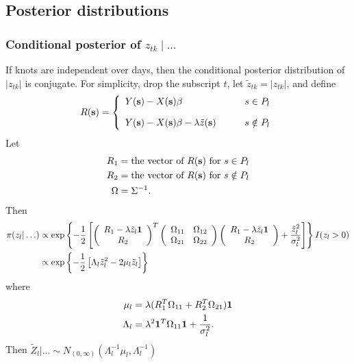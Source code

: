 \documentclass[11pt]{article}
\begin{document}
\subsection{Posterior distributions} \label{a:posterior}

\subsubsection*{Conditional posterior of $z_{tk} \mid \ldots $}\label{s:mvcondu}
If knots are independent over days, then the conditional posterior distribution of $|z_{tk}|$ is conjugate.
For simplicity, drop the subscript $t$, let $\tilde{z}_{tk} = |z_{tk}|$, and define
\begin{align*}
R(\mbox{\bf s}) = \left\{
    \begin{array}{ll}
        Y(\mbox{\bf s}) - X(\mbox{\bf s}) \beta &s \in P_l\\[1em]
        Y(\mbox{\bf s}) - X(\mbox{\bf s}) \beta - \lambda \tilde{z}(\mbox{\bf s}) \qquad & s \notin P_l
    \end{array}
\right.
\end{align*}
Let
\begin{align*}
    R_1 &= \text{the vector of } R(\mbox{\bf s}) \text{ for } s \in P_l \\
    R_2 &= \text{the vector of } R(\mbox{\bf s}) \text{ for } s \notin P_l \\
    \Omega &= \Sigma^{-1}.
\end{align*}
Then
\begin{align*}
    \pi(z_l | \ldots) &\propto \exp \left\{ -\frac{ 1 }{ 2 } \left[
        \left( \begin{array}{c}
            R_1 - \lambda \tilde{z}_l \mbox{\boldmath $1$}\\
            R_2
        \end{array} \right)^T
        \left( \begin{array}{cc}
            \Omega_{11} & \Omega_{12}\\
            \Omega_{21} & \Omega_{22}
        \end{array} \right)
        \left( \begin{array}{c}
            R_1 - \lambda \tilde{z}_l \mbox{\boldmath $1$}\\
            R_2
        \end{array} \right)
        +  \frac{ {\tilde{z}_l}^2 }{ \sigma_l^2 }\right]
    \right\} I(z_l > 0) \\
        &\propto \exp \left\{ -\frac{ 1 }{ 2 } \left[ \Lambda_l {\tilde{z}_l}^2 - 2 \mu_l \tilde{z}_l \right] \right\}
\end{align*}
where
\begin{align*}
    \mu_l &= \lambda ( R_1^T \Omega_{11} + R_2^T \Omega_{21} )\mbox{\boldmath $1$}\\
    \Lambda_l &= \lambda^2 \mbox{\boldmath $1$}^T \Omega_{11} \mbox{\boldmath $1$} + \frac{ 1 }{ \sigma^2_l }.
\end{align*}
Then $\tilde{Z}_l | \ldots \sim N_{(0, \infty)} (\Lambda_l^{-1} \mu_l, \Lambda_l^{-1})$
\end{document}
